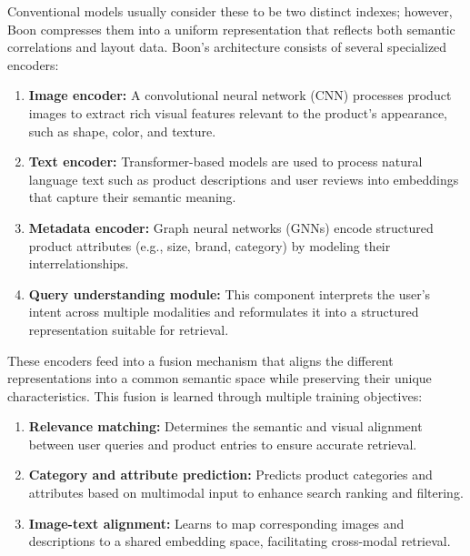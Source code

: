 \documentclass[conference]{IEEEtran}
\begin{document}
\begin{enumerate}
\begin{enumerate}
\end{enumerate}

Conventional models usually consider these to be two distinct indexes; however, Boon compresses them into a uniform representation that reflects both semantic correlations and layout data.
Boon's architecture consists of several specialized encoders:

\begin{enumerate}
    \item \textbf{Image encoder:} A convolutional neural network (CNN) processes product images to extract rich visual features relevant to the product's appearance, such as shape, color, and texture.
    
    \item \textbf{Text encoder:} Transformer-based models are used to process natural language text such as product descriptions and user reviews into embeddings that capture their semantic meaning.
    
    \item \textbf{Metadata encoder:} Graph neural networks (GNNs) encode structured product attributes (e.g., size, brand, category) by modeling their interrelationships.
    
    \item \textbf{Query understanding module:} This component interprets the user’s intent across multiple modalities and reformulates it into a structured representation suitable for retrieval.
\end{enumerate}

These encoders feed into a fusion mechanism that aligns the different representations into a common semantic space while preserving their unique characteristics. This fusion is learned through multiple training objectives:

\begin{enumerate}
    \item \textbf{Relevance matching:} Determines the semantic and visual alignment between user queries and product entries to ensure accurate retrieval.
    
    \item \textbf{Category and attribute prediction:} Predicts product categories and attributes based on multimodal input to enhance search ranking and filtering.
    
    \item \textbf{Image-text alignment:} Learns to map corresponding images and descriptions to a shared embedding space, facilitating cross-modal retrieval.
    

\end{enumerate}
\end{enumerate}
\end{document}
